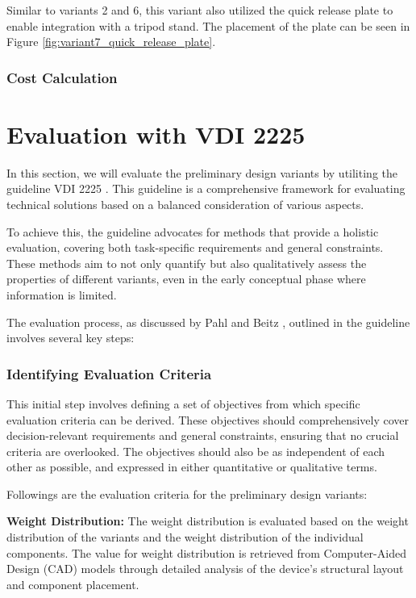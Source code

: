 Similar to variants 2 and 6, this variant also utilized the quick release plate to enable integration with a tripod stand. The placement of the plate can be seen in Figure \ref{fig:variant7_quick_release_plate}.



\subsubsection{Cost Calculation}

\section{Evaluation with VDI 2225}
In this section, we will evaluate the preliminary design variants by utiliting the guideline VDI 2225 \cite{Pahl07ac}. This guideline is a comprehensive framework for evaluating technical solutions based on a balanced consideration of various aspects.

To achieve this, the guideline advocates for methods that provide a holistic evaluation, covering both task-specific requirements and general constraints. These methods aim to not only quantify but also qualitatively assess the properties of different variants, even in the early conceptual phase where information is limited.

The evaluation process, as discussed by Pahl and Beitz \cite{Pahl07ac}, outlined in the guideline involves several key steps:

\subsubsection{Identifying Evaluation Criteria}
This initial step involves defining a set of objectives from which specific evaluation criteria can be derived. These objectives should comprehensively cover decision-relevant requirements and general constraints, ensuring that no crucial criteria are overlooked. The objectives should also be as independent of each other as possible, and expressed in either quantitative or qualitative terms.

Followings are the evaluation criteria for the preliminary design variants:

\textbf{Weight Distribution:} The weight distribution is evaluated based on the weight distribution of the variants and the weight distribution of the individual components. The value for weight distribution is retrieved from Computer-Aided Design (CAD) models through detailed analysis of the device's structural layout and component placement.

